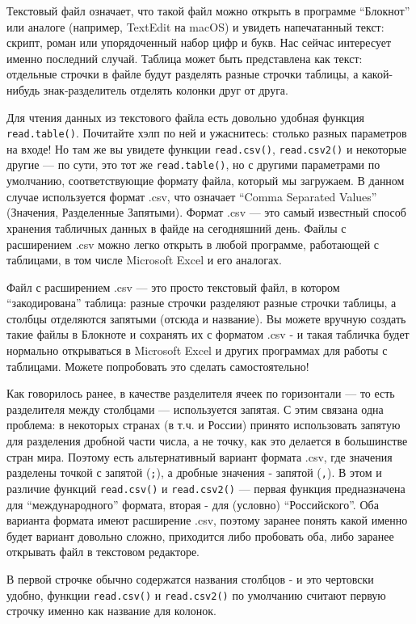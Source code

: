 \documentclass[]{book}
\begin{document}
Текстовый файл означает, что такой файл можно открыть в программе
``Блокнот'' или аналоге (например, TextEdit на macOS) и увидеть
напечатанный текст: скрипт, роман или упорядоченный набор цифр и букв.
Нас сейчас интересует именно последний случай. Таблица может быть
представлена как текст: отдельные строчки в файле будут разделять разные
строчки таблицы, а какой-нибудь знак-разделитель отделять колонки друг
от друга.

Для чтения данных из текстового файла есть довольно удобная функция
\texttt{read.table()}. Почитайте хэлп по ней и ужаснитесь: столько
разных параметров на входе! Но там же вы увидете функции
\texttt{read.csv()}, \texttt{read.csv2()} и некоторые другие --- по
сути, это тот же \texttt{read.table()}, но с другими параметрами по
умолчанию, соответствующие формату файла, который мы загружаем. В данном
случае используется формат .csv, что означает ``Comma Separated Values''
(Значения, Разделенные Запятыми). Формат .csv --- это самый известный
способ хранения табличных данных в файде на сегодняшний день. Файлы с
расширением .csv можно легко открыть в любой программе, работающей с
таблицами, в том числе Microsoft Excel и его аналогах.

Файл с расширением .csv --- это просто текстовый файл, в котором
``закодирована'' таблица: разные строчки разделяют разные строчки
таблицы, а столбцы отделяются запятыми (отсюда и название). Вы можете
вручную создать такие файлы в Блокноте и сохранять их с форматом .csv -
и такая табличка будет нормально открываться в Microsoft Excel и других
программах для работы с таблицами. Можете попробовать это сделать
самостоятельно!

Как говорилось ранее, в качестве разделителя ячеек по горизонтали --- то
есть разделителя между столбцами --- используется запятая. С этим
связана одна проблема: в некоторых странах (в т.ч. и России) принято
использовать запятую для разделения дробной части числа, а не точку, как
это делается в большинстве стран мира. Поэтому есть альтернативный
вариант формата .csv, где значения разделены точкой с запятой
(\texttt{;}), а дробные значения - запятой (\texttt{,}). В этом и
различие функций \texttt{read.csv()} и \texttt{read.csv2()} --- первая
функция предназначена для ``международного'' формата, вторая - для
(условно) ``Российского''. Оба варианта формата имеют расширение .csv,
поэтому заранее понять какой именно будет вариант довольно сложно,
приходится либо пробовать оба, либо заранее открывать файл в текстовом
редакторе.

В первой строчке обычно содержатся названия столбцов - и это чертовски
удобно, функции \texttt{read.csv()} и \texttt{read.csv2()} по умолчанию
считают первую строчку именно как название для колонок.
\end{document}
